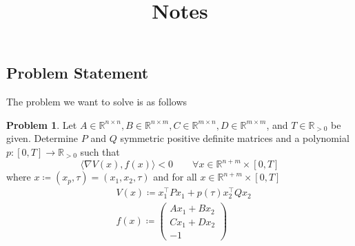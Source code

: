 \documentclass[a4paper,12pt,english]{amsart}
\title{Notes}
\newcommand\new[1]{{\color{blue}{#1}}}
\newcommand\mbb{\mathbb}
\newcommand\RR{\mbb{R}}
\numberwithin{equation}{section}
\theoremstyle{remark}
\theoremstyle{plain}
\theoremstyle{definition}
\newtheorem{problem}{Problem}
\begin{document}
\maketitle

\setcounter{section}{1}

\subsection{Problem Statement}
The problem we want to solve is as follows
\begin{problem}
Let $A\in\RR^{n\times n}, B\in\RR^{n\times m}, C\in\RR^{m\times n}, D\in\RR^{m\times m}$, and $T\in\RR_{>0}$ be given. Determine $P$ and $Q$ symmetric positive definite matrices and a polynomial $p\colon[0,T]\rightarrow\RR_{>0}$ such that
$$
\langle\nabla V(x),f(x)\rangle<0\qquad \forall x\in\RR^{n+m}\times[0,T]
$$
where $x\coloneqq (x_p,\tau)=(x_1, x_2, \tau)$ and for all $x\in\RR^{n+m}\times[0,T]$
$$
\begin{aligned}
&V(x)\coloneqq x_1^\top P x_1+p(\tau)x_2^\top Q x_2\\
&f(x)\coloneqq 
\begin{pmatrix} 
Ax_1+B x_2\\
Cx_1+D x_2\\
-1
\end{pmatrix}
\end{aligned}
$$
\new{
Alternatively
$$
\begin{aligned}
&V(x)\coloneqq x_1^\top P x_1+x_2^\top Q(\tau) x_2\\
\end{aligned}
$$
where $Q(\tau)$ is a polynomial matrix with entries of degree
at most $d$.}
\end{problem}
\end{document}
